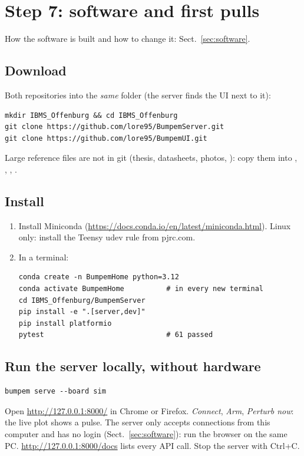 \section{Step 7: software and first pulls}\label{sec:walk-software}
How the software is built and how to change it: Sect.~\ref{sec:software}.

\subsection{Download}
Both repositories into the \emph{same} folder (the server finds the UI next to it):
\begin{lstlisting}
mkdir IBMS_Offenburg && cd IBMS_Offenburg
git clone https://github.com/lore95/BumpemServer.git
git clone https://github.com/lore95/BumpemUI.git
\end{lstlisting}
Large reference files are not in git (thesis, datasheets, photos, ): copy them into
, , , .

\subsection{Install}
\begin{enumerate}
\item Install Miniconda (\url{https://docs.conda.io/en/latest/miniconda.html}). Linux only: install the Teensy
udev rule from pjrc.com.
\item In a terminal:
\begin{lstlisting}
conda create -n BumpemHome python=3.12
conda activate BumpemHome          # in every new terminal
cd IBMS_Offenburg/BumpemServer
pip install -e ".[server,dev]"
pip install platformio
pytest                             # 61 passed
\end{lstlisting}
\end{enumerate}

\subsection{Run the server locally, without hardware}
\begin{lstlisting}
bumpem serve --board sim
\end{lstlisting}
Open \url{http://127.0.0.1:8000/} in Chrome or Firefox. \emph{Connect}, \emph{Arm}, \emph{Perturb now}: the
live plot shows a pulse. The server only accepts connections from this computer and has no login (Sect.~\ref{sec:software}): run the browser on the same PC. \url{http://127.0.0.1:8000/docs} lists every API call. Stop the server with Ctrl+C.

